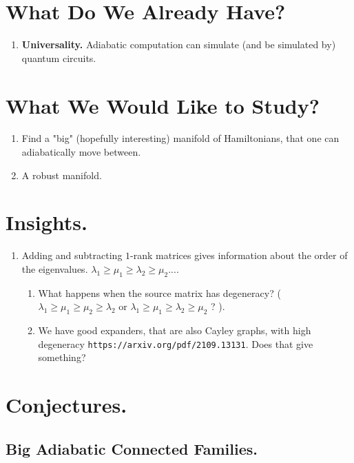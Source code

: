\documentclass[manuscript,screen,review]{acmart}
\begin{document}
\section{What Do We Already Have?}
\begin{enumerate}
    \item \textbf{Universality.} Adiabatic computation can simulate (and be simulated by) quantum circuits.   
\end{enumerate}
\section{What We Would Like to Study?}
\begin{enumerate}
    \item Find a "big" (hopefully interesting) manifold of Hamiltonians, that one can adiabatically move between. 
    \item A robust manifold.   
\end{enumerate}

\section{Insights.}
\begin{enumerate}
    \item Adding and subtracting $1$-rank matrices gives information about the order of the eigenvalues. $\lambda_{1}\ge \mu_{1} \ge \lambda_{2} \ge \mu_{2} ...$. 
    \begin{enumerate}
        \item What happens when the source matrix has degeneracy?  ( $\lambda_{1} \ge \mu_{1} \ge \mu_{2} \ge \lambda_{2}$ or $\lambda_{1}\ge \mu_{1} \ge \lambda_{2} \ge \mu_{2}$ ? ). 
        \item We have good expanders, that are also Cayley graphs, with high degeneracy \verb|https://arxiv.org/pdf/2109.13131|. Does that give something? 
    \end{enumerate}
\end{enumerate}

\section{Conjectures.} 

\subsection{Big Adiabatic Connected Families.}
\end{document}
